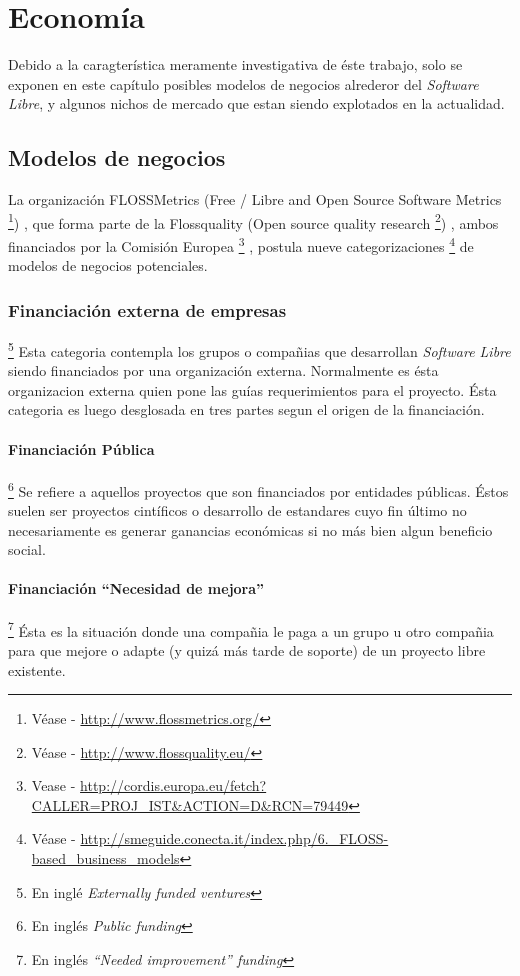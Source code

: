 \chapter{Econom\'ia}
%
%
Debido a la caragter\'istica meramente investigativa de \'este trabajo, solo
se exponen en este cap\'itulo posibles modelos de negocios alrederor del
\emph{Software Libre}, y algunos nichos de mercado que estan siendo explotados
en la actualidad.\\

\section{Modelos de negocios}
La organizaci\'on FLOSSMetrics 
(Free / Libre and Open Source Software Metrics
\footnote{V\'ease - \url{http://www.flossmetrics.org/}})
, que forma parte de la Flossquality (Open source quality research
\footnote{V\'ease - \url{http://www.flossquality.eu/}})
, ambos financiados por la Comisi\'on Europea
\footnote{Vease -
\url{http://cordis.europa.eu/fetch?CALLER=PROJ_IST&ACTION=D&RCN=79449}}
, postula nueve categorizaciones
\footnote{V\'ease -
\url{http://smeguide.conecta.it/index.php/6._FLOSS-based_business_models}} 
de modelos de negocios potenciales.


\subsection{Financiaci\'on externa de empresas}\footnote{En ingl\'e
\emph{Externally funded ventures}}
%
Esta categoria contempla los grupos o compa\~nias que desarrollan
\emph{Software Libre} siendo financiados por una organizaci\'on externa.
Normalmente es \'esta organizacion externa quien pone las gu\'ias
requerimientos para el proyecto. \'Esta categoria es luego desglosada en tres
partes segun el origen de la financiaci\'on.

\subsubsection{Financiaci\'on P\'ublica}\footnote{En ingl\'es \emph{Public
funding}}
%
Se refiere a aquellos proyectos que son financiados por entidades p\'ublicas.
\'Estos suelen ser proyectos cint\'ificos o desarrollo de estandares cuyo fin
\'ultimo no necesariamente es generar ganancias econ\'omicas si no m\'as bien
algun beneficio social.

\subsubsection{Financiaci\'on ``Necesidad de mejora''}\footnote{En ingl\'es
\emph{``Needed improvement'' funding}}
%
\'Esta es la situaci\'on donde una compa\~nia le paga a un grupo u otro
compa\~nia para que mejore o adapte (y quiz\'a m\'as tarde de soporte) de un
proyecto libre existente.

